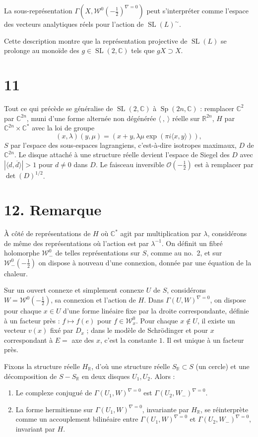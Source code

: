 \documentclass[11pt]{article}
\newcommand{\C}{\mathbb C}
\newcommand{\R}{\mathbb R}
\newcommand{\cO}{\mathcal O}
\newcommand{\cW}{\mathcal W}
\newcommand{\half}{\tfrac12}
\DeclareMathOperator{\SL}{SL}
\DeclareMathOperator{\Sp}{Sp}
\begin{document}
La sous-représentation $\Gamma(X,\cW^0(-\half)^{\nabla=0})$ peut s'interpréter comme l'espace des vecteurs analytiques réels pour l'action de $\SL(L)^\sim$.

Cette description montre que la représentation projective de $\SL(L)$ se prolonge au monoïde des $g\in\SL(2,\C)$ tels que $gX\supset X$.

\section*{11}
Tout ce qui précède se généralise de $\SL(2,\C)$ à $\Sp(2n,\C)$ : remplacer $\C^2$ par $\C^{2n}$, muni d'une forme alternée non dégénérée $\langle\ ,\ \rangle$ réelle sur $\R^{2n}$, $H$ par $\C^{2n}\times\C^*$ avec la loi de groupe
\[
(x,\lambda)(y,\mu)=(x+y,\lambda\mu\exp(\pi i\langle x,y\rangle)),
\]
$S$ par l'espace des sous-espaces lagrangiens, c'est-à-dire isotropes maximaux, $D$ de $\C^{2n}$. Le disque attaché à une structure réelle devient l'espace de Siegel des $D$ avec $|\langle d,\overline d\rangle|>1$ pour $d\ne0$ dans $D$. Le faisceau inversible $\cO(-\half)$ est à remplacer par $\det(D)^{1/2}$.

\section*{12. Remarque}
À côté de représentations de $H$ où $\C^*$ agit par multiplication par $\lambda$, considérons de même des représentations où l'action est par $\lambda^{-1}$. On définit un fibré holomorphe $\cW_-^0$ de telles représentations sur $S$, comme au no.~2, et sur $\cW_-^0(-\half)$ on dispose à nouveau d'une connexion, donnée par une équation de la chaleur.

Sur un ouvert connexe et simplement connexe $U$ de $S$, considérons $W=\cW^0(-\half)$, sa connexion et l'action de $H$. Dans $\Gamma(U,W)^{\nabla=0}$, on dispose pour chaque $x\in U$ d'une forme linéaire fixe par la droite correspondante, définie à un facteur près : $f\mapsto f(e)$ pour $f\in\cW_x^0$. Pour chaque $x\notin U$, il existe un vecteur $v(x)$ fixé par $D_x$ ; dans le modèle de Schrödinger et pour $x$ correspondant à $E=$ axe des $x$, c'est la constante $1$. Il est unique à un facteur près.

Fixons la structure réelle $H_\R$, d'où une structure réelle $S_\R\subset S$ (un cercle) et une décomposition de $S-S_\R$ en deux disques $U_1,U_2$. Alors :
\begin{enumerate}[label=(\alph*)]
\item Le complexe conjugué de $\Gamma(U_1,W)^{\nabla=0}$ est $\Gamma(U_2,W_-)^{\nabla=0}$.
\item La forme hermitienne sur $\Gamma(U_1,W)^{\nabla=0}$, invariante par $H_\R$, se réinterprète comme un accouplement bilinéaire entre $\Gamma(U_1,W)^{\nabla=0}$ et $\Gamma(U_2,W_-)^{\nabla=0}$, invariant par $H$.
\end{enumerate}
\end{document}
